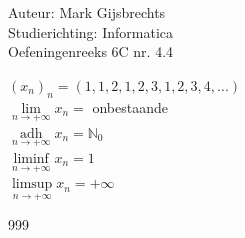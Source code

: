 \documentclass[a4paper]{article}
\newcommand{\adh}{\underset{n\rightarrow+\infty}{\operatorname{adh}}}
\begin{document}
\noindent \large Auteur: Mark Gijsbrechts \\
\noindent \large Studierichting: Informatica\\
\noindent \large Oefeningenreeks 6C nr. 4.4\\

\medskip

\normalsize



$ \left(x_{n}\right)_{n} = \left( 1, 1, 2, 1, 2, 3, 1, 2, 3, 4, ... \right) $ \\

$ \lim\limits_{n \rightarrow + \infty} x_{n} = $ onbestaande \\

$ \adh x_{n} = \mathbb{N}_{0} $ \\

$ \liminf\limits_{n \rightarrow + \infty} x_{n} =  1 $ \\

$ \limsup\limits_{n \rightarrow + \infty} x_{n} = +\infty $ \\



\begin{thebibliography}{999}
\end{thebibliography}
\end{document}
